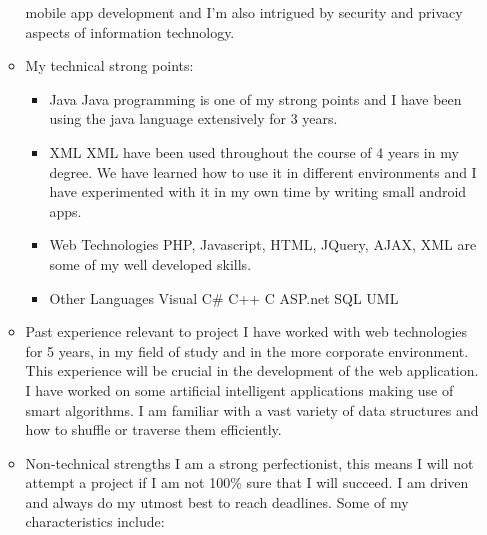 \documentclass[12pt, oneside]{article}
\begin{document}
\begin{enumerate}
\begin{itemize}
				mobile app development and I'm also intrigued by security and privacy aspects of information technology.\newline
			\item My technical strong points:
				\begin{itemize}
				\item Java\newline
					Java programming is one of my strong points and I have been using the java language extensively for 3 years.
				\item XML\newline
					XML have been used throughout the course of 4 years in my degree. We have learned how to use it 
					in different environments and I have experimented with it in my own time by writing small android apps.
				\item Web Technologies\newline
					PHP, Javascript, HTML, JQuery, AJAX, XML are some of my well developed skills.
				\item Other Languages\newline
					Visual C\#\newline
					C++\newline
					C\newline
					ASP.net\newline
					SQL\newline
					UML\newline	
				\end{itemize}				
			\item Past experience relevant to project\newline\newline
				I have worked with web technologies for 5 years, in my field of study and in the more corporate 							environment. This experience will be crucial in the development of the web application. I have worked on some artificial intelligent applications making use of smart algorithms. I am familiar with a vast variety of data structures and how to shuffle or traverse them efficiently.\newline
			\item Non-technical strengths\newline\newline
				I am  a strong perfectionist, this means I will not attempt a project if I am not 100\% sure that I will succeed. I am driven and always do my utmost best to reach deadlines.  Some of my characteristics include:\newline 

\end{itemize}
\end{enumerate}
\end{document}

